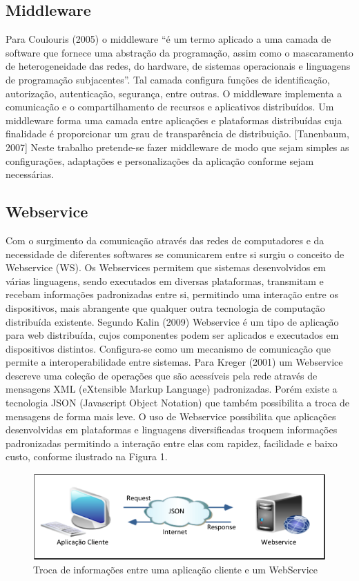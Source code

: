 \documentclass[12pt]{article}
\begin{document}
\subsection{Middleware}

Para Coulouris (2005) o middleware “é um termo aplicado a uma camada de software
que fornece uma abstração da programação, assim como o mascaramento de
heterogeneidade das redes, do hardware, de sistemas operacionais e linguagens de
programação subjacentes”. Tal camada configura funções de identificação, autorização,
autenticação, segurança, entre outras. O middleware implementa a comunicação e o
compartilhamento de recursos e aplicativos distribuídos.
Um middleware forma uma camada entre aplicações e plataformas distribuídas
cuja finalidade é proporcionar um grau de transparência de distribuição. [Tanenbaum,
2007]
Neste trabalho pretende-se fazer middleware de modo que sejam simples as
configurações, adaptações e personalizações da aplicação conforme sejam necessárias.

\subsection{Webservice}

Com o surgimento da comunicação através das redes de computadores e da necessidade
de diferentes softwares se comunicarem entre si surgiu o conceito de Webservice (WS).
Os Webservices permitem que sistemas desenvolvidos em várias linguagens,
sendo executados em diversas plataformas, transmitam e recebam informações
padronizadas entre si, permitindo uma interação entre os dispositivos, mais abrangente
que qualquer outra tecnologia de computação distribuída existente.
Segundo Kalin (2009) Webservice é um tipo de aplicação para web distribuída,
cujos componentes podem ser aplicados e executados em dispositivos distintos.
Configura-se como um mecanismo de comunicação que permite a interoperabilidade
entre sistemas. Para Kreger (2001) um Webservice descreve uma coleção de operações
que são acessíveis pela rede através de mensagens XML (eXtensible Markup Language)
padronizadas. Porém existe a tecnologia JSON (Javascript Object Notation) que
também possibilita a troca de mensagens de forma mais leve. O uso de Webservice
possibilita que aplicações desenvolvidas em plataformas e linguagens diversificadas
troquem informações padronizadas permitindo a interação entre elas com rapidez,
facilidade e baixo custo, conforme ilustrado na Figura 1.

\begin{figure}[ht]
	\centering
	\includegraphics[width=.5\textwidth]{figura1.png}
	\caption{Troca de informações entre uma aplicação cliente e um WebService}
	\label{fig:exampleFigura1}
\end{figure}
\end{document}
